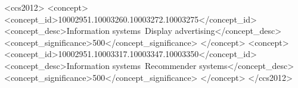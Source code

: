 \documentclass[sigconf]{acmart}
\begin{document}
\begin{abstract}


\end{abstract}
\begin{CCSXML}
<ccs2012>
<concept>
<concept_id>10002951.10003260.10003272.10003275</concept_id>
<concept_desc>Information systems~Display advertising</concept_desc>
<concept_significance>500</concept_significance>
</concept>
<concept>
<concept_id>10002951.10003317.10003347.10003350</concept_id>
<concept_desc>Information systems~Recommender systems</concept_desc>
<concept_significance>500</concept_significance>
</concept>
</ccs2012>
\end{CCSXML}


\maketitle









 
\end{document}
